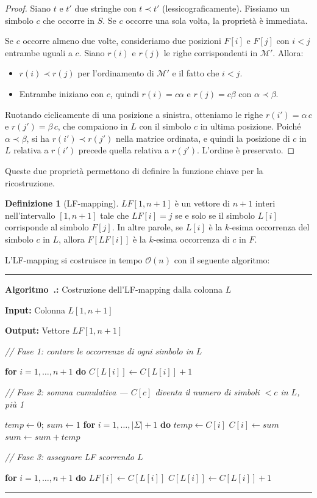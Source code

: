 \documentclass[12pt, a4paper, oneside]{book}
\newcounter{algocf}[chapter]
\renewcommand{\thealgocf}{\thechapter.\arabic{algocf}}
\newenvironment{algorithm}[1][H]{%
  \refstepcounter{algocf}%
  \par\medskip\noindent\rule{\linewidth}{0.4pt}\par\smallskip
}{%
  \par\smallskip\noindent\rule{\linewidth}{0.4pt}\par\medskip
}
\newcommand{\algcaption}[1]{\noindent\textbf{Algoritmo~\thealgocf:} #1\par\smallskip}
\newcommand{\KwIn}[1]{\noindent\textbf{Input:} #1\par}
\newcommand{\KwOut}[1]{\noindent\textbf{Output:} #1\par}
\newcommand{\BlankLine}{\par\smallskip}
\newcommand{\tcp}[1]{{\color{gray}\textit{// #1}}\par}
\newcommand{\For}[1]{\noindent\textbf{for} #1 \textbf{do}}
\theoremstyle{plain}
\theoremstyle{definition}
\newtheorem{definizione}[teorema]{Definizione}
\theoremstyle{remark}
\newcommand{\OO}[1]{\mathcal{O}\!\left(#1\right)}
\begin{document}
\begin{proof}
Siano $t$ e $t'$ due stringhe con $t \prec t'$ (lessicograficamente). Fissiamo un simbolo $c$ che occorre in $S$. Se $c$ occorre una sola volta, la proprietà è immediata.

Se $c$ occorre almeno due volte, consideriamo due posizioni $F[i]$ e $F[j]$ con $i < j$ entrambe uguali a $c$. Siano $r(i)$ e $r(j)$ le righe corrispondenti in $\mathcal{M}'$. Allora:
\begin{itemize}
  \item $r(i) \prec r(j)$ per l'ordinamento di $\mathcal{M}'$ e il fatto che $i < j$.
  \item Entrambe iniziano con $c$, quindi $r(i) = c\alpha$ e $r(j) = c\beta$ con $\alpha \prec \beta$.
\end{itemize}
Ruotando ciclicamente di una posizione a sinistra, otteniamo le righe $r(i') = \alpha\, c$ e $r(j') = \beta\, c$, che compaiono in $L$ con il simbolo $c$ in ultima posizione. Poiché $\alpha \prec \beta$, si ha $r(i') \prec r(j')$ nella matrice ordinata, e quindi la posizione di $c$ in $L$ relativa a $r(i')$ precede quella relativa a $r(j')$. L'ordine è preservato.
\end{proof}

Queste due proprietà permettono di definire la funzione chiave per la ricostruzione.

\begin{definizione}[LF-mapping]
\label{def:lf-mapping}
$LF[1, n+1]$ è un vettore di $n+1$ interi nell'intervallo $[1, n+1]$ tale che $LF[i] = j$ se e solo se il simbolo $L[i]$ corrisponde al simbolo $F[j]$. In altre parole, se $L[i]$ è la $k$-esima occorrenza del simbolo $c$ in $L$, allora $F[LF[i]]$ è la $k$-esima occorrenza di $c$ in $F$.
\end{definizione}

L'LF-mapping si costruisce in tempo $\OO{n}$ con il seguente algoritmo:

\begin{algorithm}[H]
\algcaption{Costruzione dell'LF-mapping dalla colonna $L$}
\label{alg:lf-mapping}
\KwIn{Colonna $L[1, n+1]$}
\KwOut{Vettore $LF[1, n+1]$}
\BlankLine
\tcp{Fase 1: contare le occorrenze di ogni simbolo in $L$}
\For{$i = 1, \ldots, n+1$}{
  $C[L[i]] \gets C[L[i]] + 1$\;
}
\BlankLine
\tcp{Fase 2: somma cumulativa — $C[c]$ diventa il numero di simboli $< c$ in $L$, più 1}
$temp \gets 0$; $sum \gets 1$\;
\For{$i = 1, \ldots, |\Sigma|+1$}{
  $temp \gets C[i]$\;
  $C[i] \gets sum$\;
  $sum \gets sum + temp$\;
}
\BlankLine
\tcp{Fase 3: assegnare LF scorrendo $L$}
\For{$i = 1, \ldots, n+1$}{
  $LF[i] \gets C[L[i]]$\;
  $C[L[i]] \gets C[L[i]] + 1$\;
}
\end{algorithm}
\end{document}
